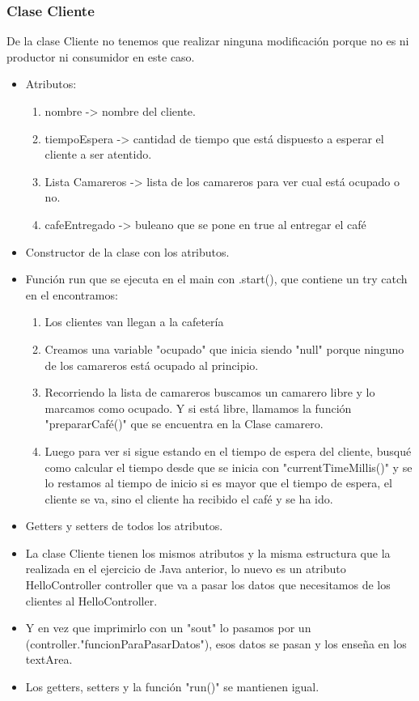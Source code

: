 \documentclass[a4paper,12pt]{article}
\begin{document}
\subsubsection{Clase Cliente}
De la clase Cliente no tenemos que realizar ninguna modificación porque no es ni productor ni consumidor en este caso.
\begin{itemize}
\item Atributos:
    \begin{enumerate}
        \item nombre -> nombre del cliente.
        \item tiempoEspera -> cantidad de tiempo que está dispuesto a esperar el cliente a ser atentido.
        \item Lista Camareros -> lista de los camareros para ver cual está ocupado o no.
        \item cafeEntregado -> buleano que se pone en true al entregar el café
    \end{enumerate}
\item Constructor de la clase con los atributos.
\item Función run que se ejecuta en el main con .start(), que contiene un try catch en el encontramos:
    \begin{enumerate}
        \item Los clientes van llegan a la cafetería
        \item Creamos una variable "ocupado" que inicia siendo "null" porque ninguno de los camareros está ocupado al principio.
        \item Recorriendo la lista de camareros buscamos un camarero libre y lo marcamos como ocupado. Y si está libre, llamamos la función "prepararCafé()" que se encuentra en la Clase camarero.
        \item Luego para ver si sigue estando en el tiempo de espera del cliente, busqué como calcular el tiempo desde que se inicia con "currentTimeMillis()" y se lo restamos al tiempo de inicio si es mayor que el tiempo de espera, el cliente se va, sino el cliente ha recibido el café y se ha ido.
    \end{enumerate}
\item Getters y setters de todos los atributos. 
\item La clase Cliente tienen los mismos atributos y la misma estructura que la realizada en el ejercicio de Java anterior, lo nuevo es un atributo HelloController controller que va a pasar los datos que necesitamos de los clientes al HelloController.
\item Y en vez que imprimirlo con un "sout" lo pasamos por un (controller."funcionParaPasarDatos"), esos datos se pasan y los enseña en los textArea.
\item Los getters, setters y la función "run()" se mantienen igual.
\end{itemize}
\end{document}

